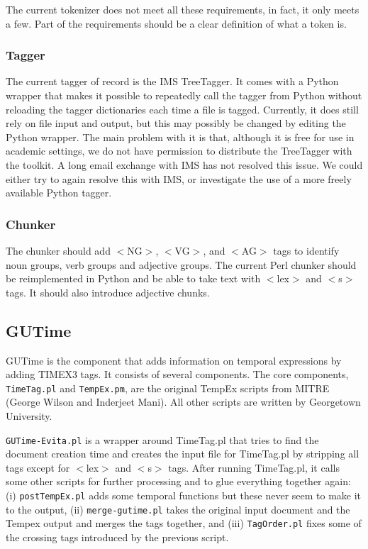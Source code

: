 \documentclass[11pt]{article}
\newcommand{\tag}[1]{$<$#1$>$}
\begin{document}
The current tokenizer does not meet all these requirements, in fact, it only meets a few. Part of the requirements should be a clear definition of what a token is. 
 
 
\subsubsection{Tagger}

The current tagger of record is the IMS TreeTagger. It comes with a Python wrapper that makes it possible to repeatedly call the tagger from Python without reloading the tagger dictionaries each time a file is tagged. Currently, it does still rely on file input and output, but this may possibly be changed by editing the Python wrapper. The main problem with it is that, although it is free for use in academic settings, we do not have permission to distribute the TreeTagger with the toolkit. A long email exchange with IMS has not resolved this issue. We could either try to again resolve this with IMS, or investigate the use of a more freely available Python tagger. 


\subsubsection{Chunker}

The chunker should add \tag{NG}, \tag{VG}, and \tag{AG} tags to identify noun groups, verb groups and adjective groups. The current Perl chunker should be reimplemented in Python and be able to take text with $<$lex$>$ and $<$s$>$ tags. It should also introduce adjective chunks.


\subsection{GUTime}

GUTime is the component that adds information on temporal expressions by adding TIMEX3 tags. It consists of several components. The core components, {\tt TimeTag.pl} and {\tt TempEx.pm}, are the original TempEx scripts from MITRE (George Wilson and Inderjeet Mani). All other scripts are written by Georgetown University. 

{\tt GUTime-Evita.pl} is a wrapper around TimeTag.pl that tries to find the document creation time and creates the input file for TimeTag.pl by stripping all tags except for $<$lex$>$ and $<$s$>$ tags. After running TimeTag.pl, it calls some other scripts for further processing and to glue everything together again: (i) {\tt postTempEx.pl} adds some temporal functions but these never seem to make it to the output, (ii) {\tt merge-gutime.pl} takes the original input document and the Tempex output and merges the tags together, and (iii) {\tt TagOrder.pl} fixes some of the crossing tags introduced by the previous script.
\end{document}
